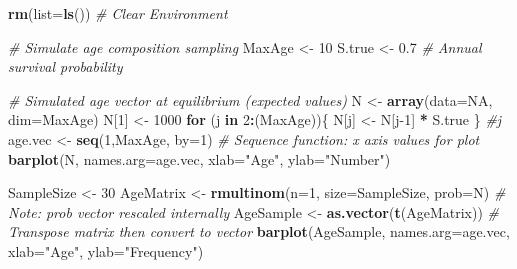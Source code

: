 \documentclass[
]{krantz}
\makeatletter
\newenvironment{Shaded}{\begin{snugshade}}{\end{snugshade}}
\newcommand{\AttributeTok}[1]{\textcolor[rgb]{0.27,0.27,0.27}{#1}}
\newcommand{\CommentTok}[1]{\textcolor[rgb]{0.37,0.37,0.37}{\textit{#1}}}
\newcommand{\ConstantTok}[1]{\textcolor[rgb]{0.37,0.37,0.37}{#1}}
\newcommand{\ControlFlowTok}[1]{\textcolor[rgb]{0.27,0.27,0.27}{\textbf{#1}}}
\newcommand{\DecValTok}[1]{\textcolor[rgb]{0.06,0.06,0.06}{#1}}
\newcommand{\FloatTok}[1]{\textcolor[rgb]{0.06,0.06,0.06}{#1}}
\newcommand{\FunctionTok}[1]{\textcolor[rgb]{0.27,0.27,0.27}{\textbf{#1}}}
\newcommand{\NormalTok}[1]{#1}
\newcommand{\OtherTok}[1]{\textcolor[rgb]{0.37,0.37,0.37}{#1}}
\newcommand{\SpecialCharTok}[1]{\textcolor[rgb]{0.43,0.43,0.43}{\textbf{#1}}}
\newcommand{\StringTok}[1]{\textcolor[rgb]{0.5,0.5,0.5}{#1}}
\newenvironment{kframe}{%
\medskip{}
\setlength{\fboxsep}{.8em}
 \def\at@end@of@kframe{}%
 \ifinner\ifhmode%
  \def\at@end@of@kframe{\end{minipage}}%
  \begin{minipage}{\columnwidth}%
 \fi\fi%
 \def\FrameCommand##1{\hskip\@totalleftmargin \hskip-\fboxsep
 \colorbox{shadecolor}{##1}\hskip-\fboxsep
     \hskip-\linewidth \hskip-\@totalleftmargin \hskip\columnwidth}%
 \MakeFramed {\advance\hsize-\width
   \@totalleftmargin\z@ \linewidth\hsize
   \@setminipage}}%
 {\par\unskip\endMakeFramed%
 \at@end@of@kframe}
\renewenvironment{Shaded}{\begin{kframe}}{\end{kframe}}
\makeatother
\begin{document}
\begin{Shaded}
\begin{Highlighting}[]
\FunctionTok{rm}\NormalTok{(}\AttributeTok{list=}\FunctionTok{ls}\NormalTok{()) }\CommentTok{\# Clear Environment}

\CommentTok{\# Simulate age composition sampling}
\NormalTok{MaxAge }\OtherTok{\textless{}{-}} \DecValTok{10}
\NormalTok{S.true }\OtherTok{\textless{}{-}} \FloatTok{0.7} \CommentTok{\# Annual survival probability}

\CommentTok{\# Simulated age vector at equilibrium (expected values)}
\NormalTok{N }\OtherTok{\textless{}{-}} \FunctionTok{array}\NormalTok{(}\AttributeTok{data=}\ConstantTok{NA}\NormalTok{, }\AttributeTok{dim=}\NormalTok{MaxAge)}
\NormalTok{N[}\DecValTok{1}\NormalTok{] }\OtherTok{\textless{}{-}} \DecValTok{1000}
\ControlFlowTok{for}\NormalTok{ (j }\ControlFlowTok{in} \DecValTok{2}\SpecialCharTok{:}\NormalTok{(MaxAge))\{}
\NormalTok{  N[j] }\OtherTok{\textless{}{-}}\NormalTok{ N[j}\DecValTok{{-}1}\NormalTok{] }\SpecialCharTok{*}\NormalTok{ S.true}
\NormalTok{\} }\CommentTok{\#j}
\NormalTok{age.vec }\OtherTok{\textless{}{-}} \FunctionTok{seq}\NormalTok{(}\DecValTok{1}\NormalTok{,MaxAge, }\AttributeTok{by=}\DecValTok{1}\NormalTok{)  }\CommentTok{\# Sequence function: x axis values for plot}
\FunctionTok{barplot}\NormalTok{(N, }\AttributeTok{names.arg=}\NormalTok{age.vec, }\AttributeTok{xlab=}\StringTok{"Age"}\NormalTok{, }\AttributeTok{ylab=}\StringTok{"Number"}\NormalTok{)}

\NormalTok{SampleSize }\OtherTok{\textless{}{-}} \DecValTok{30}
\NormalTok{AgeMatrix }\OtherTok{\textless{}{-}} \FunctionTok{rmultinom}\NormalTok{(}\AttributeTok{n=}\DecValTok{1}\NormalTok{, }\AttributeTok{size=}\NormalTok{SampleSize, }\AttributeTok{prob=}\NormalTok{N)}
\CommentTok{\# Note: prob vector rescaled internally}
\NormalTok{AgeSample }\OtherTok{\textless{}{-}} \FunctionTok{as.vector}\NormalTok{(}\FunctionTok{t}\NormalTok{(AgeMatrix)) }\CommentTok{\# Transpose matrix then convert to vector}
\FunctionTok{barplot}\NormalTok{(AgeSample, }\AttributeTok{names.arg=}\NormalTok{age.vec, }\AttributeTok{xlab=}\StringTok{"Age"}\NormalTok{, }\AttributeTok{ylab=}\StringTok{"Frequency"}\NormalTok{)}
\end{Highlighting}
\end{Shaded}
\end{document}
